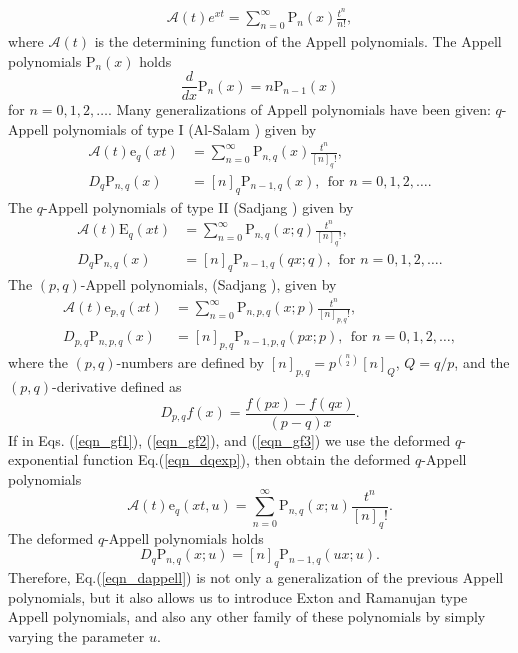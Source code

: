 \documentclass[12pt]{article}
\newcommand{\e}{\mathrm{e}}
\newcommand{\A}{\mathcal{A}}
\newcommand{\p}{\mathrm{P}}
\newcommand{\E}{\mathrm{E}}
\begin{document}
\begin{align*}
    \A(t)e^{xt}=\sum_{n=0}^{\infty}\p_{n}(x)\frac{t^n}{n!},
\end{align*}
where $\A(t)$ is the determining function of the Appell polynomials. The Appell polynomials $\p_{n}(x)$ holds
\begin{equation*}
    \frac{d}{dx}\p_{n}(x)=n\p_{n-1}(x)
\end{equation*}
for $n=0,1,2,\ldots$. Many generalizations of Appell polynomials have been given: $q$-Appell polynomials of type I (Al-Salam \cite{al-salam}) given by
\begin{align}
    \A(t)\e_{q}(xt)&=\sum_{n=0}^{\infty}\p_{n,q}(x)\frac{t^n}{[n]_{q}!},\label{eqn_gf1}\\
    D_{q}\p_{n,q}(x)&=[n]_{q}\p_{n-1,q}(x),\ \ \text{for } n=0,1,2,\ldots.\label{eqn_p1}
\end{align}
The $q$-Appell polynomials of type II (Sadjang \cite{sadjang1}) given by
\begin{align}
    \A(t)\E_{q}(xt)&=\sum_{n=0}^{\infty}\p_{n,q}(x;q)\frac{t^n}{[n]_{q}!},\label{eqn_gf2}\\
    D_{q}\p_{n,q}(x)&=[n]_{q}\p_{n-1,q}(qx;q),\ \ \text{for } n=0,1,2,\ldots.\label{eqn_p2}
\end{align}
The $(p,q)$-Appell polynomials, (Sadjang \cite{sadjang2}), given by
\begin{align}
    \A(t)\e_{p,q}(xt)&=\sum_{n=0}^{\infty}\p_{n,p,q}(x;p)\frac{t^n}{[n]_{p,q}!},\label{eqn_gf3}\\
    D_{p,q}\p_{n,p,q}(x)&=[n]_{p,q}\p_{n-1,p,q}(px;p),\ \ \text{for } n=0,1,2,\ldots,\label{eqn_p3}
\end{align}
where the $(p,q)$-numbers are defined by $[n]_{p,q}=p^{\binom{n}{2}}[n]_{Q}$, $Q=q/p$, and the $(p,q)$-derivative defined as
\begin{equation*}
    D_{p,q}f(x)=\frac{f(px)-f(qx)}{(p-q)x}.
\end{equation*}
If in Eqs. (\ref{eqn_gf1}), (\ref{eqn_gf2}), and (\ref{eqn_gf3}) we use the deformed $q$-exponential function Eq.(\ref{eqn_dqexp}), then obtain the deformed $q$-Appell polynomials 
\begin{equation}\label{eqn_dappell}
    \A(t)\e_{q}(xt,u)=\sum_{n=0}^{\infty}\p_{n,q}(x;u)\frac{t^n}{[n]_{q}!}.
\end{equation}
The deformed $q$-Appell polynomials holds
\begin{equation*}
    D_{q}\p_{n,q}(x;u)=[n]_{q}\p_{n-1,q}(ux;u).
\end{equation*}
Therefore, Eq.(\ref{eqn_dappell}) is not only a generalization of the previous Appell polynomials, but it also allows us to introduce Exton and Ramanujan type Appell polynomials, and also any other family of these polynomials by simply varying the parameter $u$.
\end{document}
